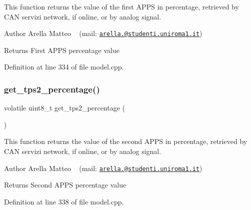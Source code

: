 This function returns the value of the first A\+P\+PS in percentage, retrieved by C\+AN servizi network, if online, or by analog signal. 

\begin{DoxyAuthor}{Author}
Arella Matteo ~\newline
 (mail\+: \href{mailto:arella.1646983@studenti.uniroma1.it}{\tt arella.@studenti.\+uniroma1.\+it})
\end{DoxyAuthor}
\begin{DoxyReturn}{Returns}
First A\+P\+PS percentage value 
\end{DoxyReturn}


Definition at line 334 of file model.\+cpp.

\mbox{\label{group___board__model__group_gae563bbe9e3c31913df498ebd7cbf6c10}} 
\subsubsection{\texorpdfstring{get\+\_\+tps2\+\_\+percentage()}{get\_tps2\_percentage()}}
{\footnotesize\ttfamily volatile uint8\+\_\+t get\+\_\+tps2\+\_\+percentage (\begin{DoxyParamCaption}{ }\end{DoxyParamCaption})}



This function returns the value of the second A\+P\+PS in percentage, retrieved by C\+AN servizi network, if online, or by analog signal. 

\begin{DoxyAuthor}{Author}
Arella Matteo ~\newline
 (mail\+: \href{mailto:arella.1646983@studenti.uniroma1.it}{\tt arella.@studenti.\+uniroma1.\+it})
\end{DoxyAuthor}
\begin{DoxyReturn}{Returns}
Second A\+P\+PS percentage value 
\end{DoxyReturn}


Definition at line 338 of file model.\+cpp.

\mbox{\label{group___board__model__group_gace5a444da39d4366693503c53f0841c2}} 
